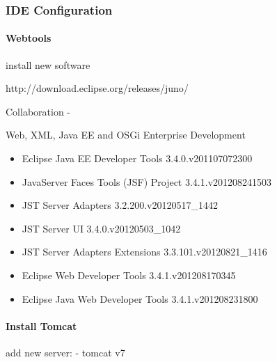 \subsubsection{IDE Configuration}

\paragraph{Webtools}
install new software

http://download.eclipse.org/releases/juno/

Collaboration	
-     

Web, XML, Java EE and OSGi Enterprise Development	
\begin{itemize}
	\item Eclipse Java EE Developer Tools	3.4.0.v201107072300
	\item JavaServer Faces Tools (JSF) Project	3.4.1.v201208241503
	\item JST Server Adapters	3.2.200.v20120517\_1442
	\item JST Server UI	3.4.0.v20120503\_1042
	\item JST Server Adapters Extensions	3.3.101.v20120821\_1416
	\item Eclipse Web Developer Tools	3.4.1.v201208170345
	\item Eclipse Java Web Developer Tools	3.4.1.v201208231800
\end{itemize} 
\paragraph{Install Tomcat}

add new server:
- tomcat v7


